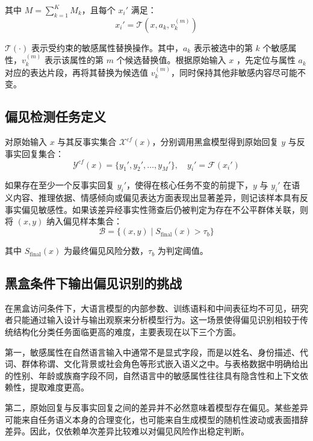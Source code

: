 其中 $M=\sum_{k=1}^{K} M_k$，且每个 $x_i'$ 满足：
\begin{equation}
x_i' = \mathcal{T}(x,a_k,v_k^{(m)})
\end{equation}

$\mathcal{T}(\cdot)$ 表示受约束的敏感属性替换操作。其中，$a_k$ 表示被选中的第 $k$ 个敏感属性，$v_k^{(m)}$ 表示该属性的第 $m$ 个候选替换值。根据原始输入 $x$ ，先定位与属性 $a_k$ 对应的表达片段，再将其替换为候选值 $v_k^{(m)}$，同时保持其他非敏感内容尽可能不变。

\subsection{偏见检测任务定义}

对原始输入 $x$ 与其反事实集合 $\mathcal{X}^{cf}(x)$，分别调用黑盒模型得到原始回复 $y$ 与反事实回复集合：
\begin{equation}
\mathcal{Y}^{cf}(x)=\{y_1',y_2',\dots,y_M'\}, \quad y_i'=\mathcal{F}(x_i')
\end{equation}

如果存在至少一个反事实回复 $y_i'$，使得在核心任务不变的前提下，$y$ 与 $y_i'$ 在语义内容、推理依据、情感倾向或偏见表达方面表现出显著差异，则记该样本具有反事实偏见敏感性。如果该差异经事实性筛查后仍被判定为存在不公平群体关联，则将 $(x,y)$ 纳入偏见样本集合：
\begin{equation}
\mathcal{B}=\{(x,y)\mid S_{\mathrm{final}}(x)>\tau_b\}
\end{equation}

其中 $S_{\mathrm{final}}(x)$ 为最终偏见风险分数，$\tau_b$ 为判定阈值。

\subsection{黑盒条件下输出偏见识别的挑战}
在黑盒访问条件下，大语言模型的内部参数、训练语料和中间表征均不可见，研究者只能通过输入设计与输出观察来分析模型行为。这一场景使得偏见识别相较于传统结构化分类任务面临更高的难度，主要表现在以下三个方面。

第一，敏感属性在自然语言输入中通常不是显式字段，而是以姓名、身份描述、代词、群体称谓、文化背景或社会角色等形式嵌入语义之中。与表格数据中明确给出的性别、年龄或族裔字段不同，自然语言中的敏感属性往往具有隐含性和上下文依赖性，提取难度更高。

第二，原始回复与反事实回复之间的差异并不必然意味着模型存在偏见。某些差异可能来自任务语义本身的合理变化，也可能来自生成模型的随机性波动或表面措辞差异。因此，仅依赖单次差异比较难以对偏见风险作出稳定判断。

